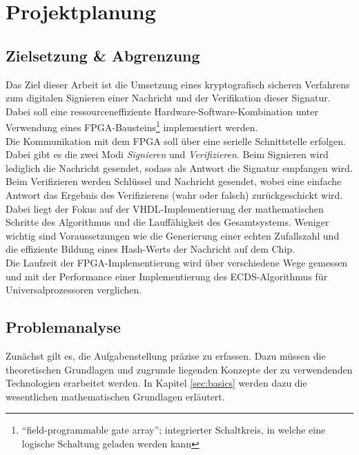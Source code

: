 
\chapter{Projektplanung} \label{sec:planung}


\section{Zielsetzung \& Abgrenzung} \label{sec:ziele}

Das Ziel dieser Arbeit ist die Umsetzung eines kryptografisch sicheren Verfahrens zum digitalen Signieren einer Nachricht und der Verifikation dieser Signatur. Dabei soll eine ressourceneffiziente Hardware-Software-Kombination unter Verwendung eines FPGA-Bausteins\footnote{``field-programmable gate array''; integrierter Schaltkreis, in welche eine logische Schaltung geladen werden kann} implementiert werden. \\

Die Kommunikation mit dem FPGA soll über eine serielle Schnittstelle erfolgen. Dabei gibt es die zwei Modi \textit{Signieren} und \textit{Verifizieren}. Beim Signieren wird lediglich die Nachricht gesendet, sodass als Antwort die Signatur empfangen wird. Beim Verifizieren werden Schlüssel und Nachricht gesendet, wobei eine einfache Antwort das Ergebnis des Verifizierens (wahr oder falsch) zurückgeschickt wird. Dabei liegt der Fokus auf der VHDL-Implementierung der mathematischen Schritte des Algorithmus und die Lauffähigkeit des Gesamtsystems. Weniger wichtig sind Voraussetzungen wie die Generierung einer echten Zufallszahl und die effiziente Bildung eines Hash-Werts der Nachricht auf dem Chip. \\

Die Laufzeit der FPGA-Implementierung wird über verschiedene Wege gemessen und mit der Performance einer Implementierung des ECDS-Algorithmus für Universalprozessoren verglichen. \\  


\section{Problemanalyse}

Zunächst gilt es, die Aufgabenstellung präzise zu erfassen. Dazu müssen die theoretischen Grundlagen und zugrunde liegenden Konzepte der zu verwendenden Technologien erarbeitet werden. In Kapitel \ref{sec:basics} werden dazu die wesentlichen mathematischen Grundlagen erläutert. \\

